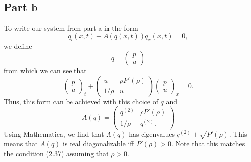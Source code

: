 \documentclass{article}
\begin{document}
\subsection{Part b}
To write our system from part a in the form 
\[
q_t(x,t) + A(q(x,t)) q_x(x,t) = 0,
\]
we define 
\[
q=\begin{pmatrix}
	p\\u
\end{pmatrix}
\]
from which we can see that 
\[
\begin{pmatrix}
	p\\u
\end{pmatrix}_t+\begin{pmatrix}
u &\rho P'(\rho)\\1/\rho &u
\end{pmatrix}\begin{pmatrix}
p\\u
\end{pmatrix}_x=0.
\]
Thus, this form can be achieved with this choice of $q$ and 
\[
A(q)=\begin{pmatrix}
	q^{(2)} &\rho P'(\rho)\\1/\rho &q^{(2)}.
\end{pmatrix}
\]
Using Mathematica, we find that $A(q)$ has eigenvalues $q^{(2)}\pm\sqrt{P'(\rho)}$. 
This means that $A(q)$ is real diagonalizable iff $P'(\rho)>0$. Note that this matches the condition (2.37) assuming that $\rho>0$.  	
 
\end{document}
